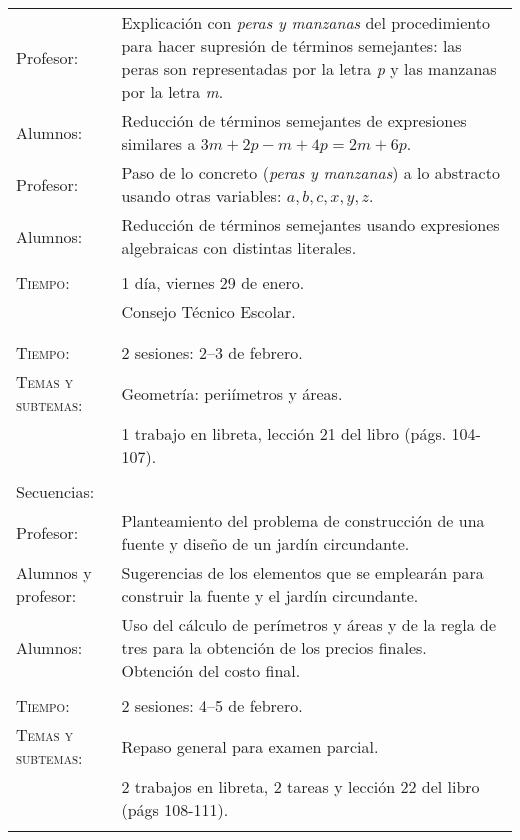 \documentclass[letterpaper,10pt]{article}
\begin{document}
\begin{tabular}[t]{R{0.25\textwidth}p{0.71\textwidth}}

    Profesor:   & Explicaci\'on con \emph{peras y manzanas} del procedimiento
    para hacer supresi\'on de t\'erminos semejantes: las peras son representadas
    por la letra \emph{p} y las manzanas por la letra \emph{m}. \\    
    Alumnos:     & Reducci\'on de t\'erminos semejantes de expresiones similares
    a $3m+2p-m+4p=2m+6p$. \\    
    Profesor:   & Paso de lo concreto (\emph{peras y manzanas}) a lo abstracto
    usando otras variables: $a,b,c,x,y,z$. \\    
    Alumnos:     & Reducci\'on de t\'erminos semejantes usando expresiones
    algebraicas con distintas literales.
\\ \hline \\
    \textsc{Tiempo:}& 1 d\'ia, viernes 29 de enero. \\
                    & {\Large \sc Consejo T\'ecnico Escolar.} \\ 
\\ \hline \\
\textsc{Tiempo:}          & 2 sesiones: 2--3  de febrero. \\
    \textsc{Temas y subtemas:}& Geometr\'ia: peri\'imetros y \'areas.\\    
    & 1 trabajo en libreta, lecci\'on 21 del libro 
    (p\'ags. 104-107). \\ \\
    \large{\sc Secuencias:} \\
    Profesor:   & Planteamiento del problema de construcci\'on de una fuente y
    dise\~no de un jard\'in circundante. \\
    Alumnos y profesor:& Sugerencias de los elementos que se emplear\'an para 
    construir la fuente y el jard\'in circundante. \\
    Alumnos:    & Uso del c\'alculo de per\'imetros y \'areas y de la regla de
    tres para la obtenci\'on de los precios finales. Obtenci\'on del costo 
    final.
\\ \hline \\
\textsc{Tiempo:}          & 2 sesiones: 4--5  de febrero. \\
    \textsc{Temas y subtemas:}& Repaso general para examen parcial.\\    
    & 2 trabajos en libreta, 2 tareas y lecci\'on 22 
    del libro (p\'ags 108-111). \\ \\

\end{tabular}
\end{document}
